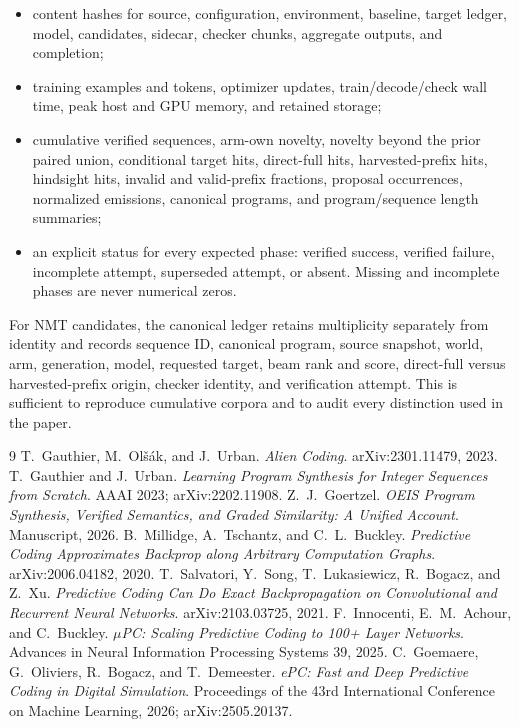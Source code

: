 \documentclass[11pt]{article}
\begin{document}
\begin{itemize}
  \item content hashes for source, configuration, environment, baseline, target ledger,
        model, candidates, sidecar, checker chunks, aggregate outputs, and completion;
  \item training examples and tokens, optimizer updates, train/decode/check wall time,
        peak host and GPU memory, and retained storage;
  \item cumulative verified sequences, arm-own novelty, novelty beyond the prior paired
        union, conditional target hits, direct-full hits, harvested-prefix hits, hindsight
        hits, invalid and valid-prefix fractions, proposal occurrences, normalized
        emissions, canonical programs, and program/sequence length summaries;
  \item an explicit status for every expected phase: verified success, verified failure,
        incomplete attempt, superseded attempt, or absent.  Missing and incomplete phases are never numerical
        zeros.
\end{itemize}

For NMT candidates, the canonical ledger retains multiplicity separately from identity and
records sequence ID, canonical program, source snapshot, world, arm, generation, model,
requested target, beam rank and score, direct-full versus harvested-prefix origin, checker
identity, and verification attempt.  This is sufficient to reproduce cumulative corpora
and to audit every distinction used in the paper.

\begin{thebibliography}{9}
 T.~Gauthier, M.~Ol\v{s}\'ak, and J.~Urban.
  \emph{Alien Coding}. arXiv:2301.11479, 2023.
 T.~Gauthier and J.~Urban.
  \emph{Learning Program Synthesis for Integer Sequences from Scratch}.
  AAAI 2023; arXiv:2202.11908.
 Z.~J.~Goertzel.
  \emph{OEIS Program Synthesis, Verified Semantics, and Graded Similarity:
  A Unified Account}. Manuscript, 2026.
 B.~Millidge, A.~Tschantz, and C.~L.~Buckley.
  \emph{Predictive Coding Approximates Backprop along Arbitrary Computation Graphs}.
  arXiv:2006.04182, 2020.
 T.~Salvatori, Y.~Song, T.~Lukasiewicz, R.~Bogacz, and Z.~Xu.
  \emph{Predictive Coding Can Do Exact Backpropagation on Convolutional and Recurrent
  Neural Networks}. arXiv:2103.03725, 2021.
 F.~Innocenti, E.~M.~Achour, and C.~Buckley.
  \emph{$\mu$PC: Scaling Predictive Coding to 100+ Layer Networks}.
  Advances in Neural Information Processing Systems 39, 2025.
 C.~Goemaere, G.~Oliviers, R.~Bogacz, and T.~Demeester.
  \emph{ePC: Fast and Deep Predictive Coding in Digital Simulation}.
  Proceedings of the 43rd International Conference on Machine Learning, 2026;
  arXiv:2505.20137.
\end{thebibliography}
\end{document}
